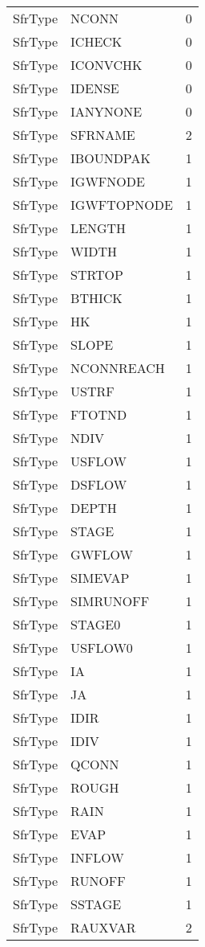 \begin{longtable}{p{6cm} p{4cm} p{2cm} }
SfrType &  NCONN & 0 \\ 
SfrType &  ICHECK & 0 \\ 
SfrType &  ICONVCHK & 0 \\ 
SfrType &  IDENSE & 0 \\ 
SfrType &  IANYNONE & 0 \\ 
SfrType & SFRNAME & 2 \\ 
SfrType &  IBOUNDPAK & 1 \\ 
SfrType &  IGWFNODE & 1 \\ 
SfrType &  IGWFTOPNODE & 1 \\ 
SfrType &  LENGTH & 1 \\ 
SfrType &  WIDTH & 1 \\ 
SfrType &  STRTOP & 1 \\ 
SfrType &  BTHICK & 1 \\ 
SfrType &  HK & 1 \\ 
SfrType &  SLOPE & 1 \\ 
SfrType &  NCONNREACH & 1 \\ 
SfrType &  USTRF & 1 \\ 
SfrType &  FTOTND & 1 \\ 
SfrType &  NDIV & 1 \\ 
SfrType &  USFLOW & 1 \\ 
SfrType &  DSFLOW & 1 \\ 
SfrType &  DEPTH & 1 \\ 
SfrType &  STAGE & 1 \\ 
SfrType &  GWFLOW & 1 \\ 
SfrType &  SIMEVAP & 1 \\ 
SfrType &  SIMRUNOFF & 1 \\ 
SfrType &  STAGE0 & 1 \\ 
SfrType &  USFLOW0 & 1 \\ 
SfrType &  IA & 1 \\ 
SfrType &  JA & 1 \\ 
SfrType &  IDIR & 1 \\ 
SfrType &  IDIV & 1 \\ 
SfrType &  QCONN & 1 \\ 
SfrType &  ROUGH & 1 \\ 
SfrType &  RAIN & 1 \\ 
SfrType &  EVAP & 1 \\ 
SfrType &  INFLOW & 1 \\ 
SfrType &  RUNOFF & 1 \\ 
SfrType &  SSTAGE & 1 \\ 
SfrType & RAUXVAR & 2 \\ 

\end{longtable}
